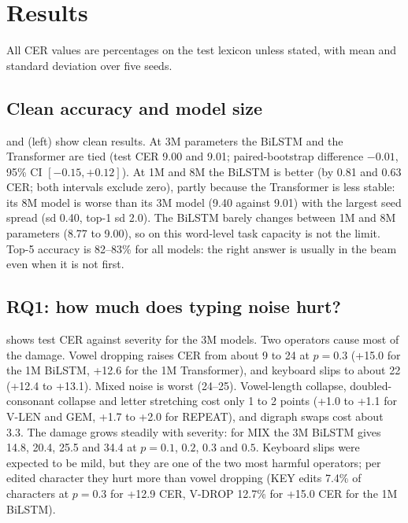 \section{Results}
\label{sec:results}
All CER values are percentages on the test lexicon unless stated, with mean and standard deviation over five seeds.

\subsection{Clean accuracy and model size}
 and  (left) show clean results.
At 3M parameters the BiLSTM and the Transformer are tied (test CER 9.00 and 9.01; paired-bootstrap difference $-0.01$, 95\% CI $[-0.15,+0.12]$).
At 1M and 8M the BiLSTM is better (by 0.81 and 0.63 CER; both intervals exclude zero), partly because the Transformer is less stable: its 8M model is worse than its 3M model (9.40 against 9.01) with the largest seed spread (sd 0.40, top-1 sd 2.0).
The BiLSTM barely changes between 1M and 8M parameters (8.77 to 9.00), so on this word-level task capacity is not the limit.
Top-5 accuracy is 82--83\% for all models: the right answer is usually in the beam even when it is not first.

\begin{table}[t]
\caption{Clean results (mean $\pm$ sd over five seeds). Dev and test CER are in \%, with beam 10. Bold: lowest test CER.}
\label{tab:c3}
\centering\scriptsize
\setlength{\tabcolsep}{3pt}
\resizebox{\columnwidth}{!}{}
\end{table}

\subsection{RQ1: how much does typing noise hurt?}
\label{sec:rq1}
 shows test CER against severity for the 3M models.
Two operators cause most of the damage.
Vowel dropping raises CER from about 9 to 24 at $p{=}0.3$ (+15.0 for the 1M BiLSTM, +12.6 for the 1M Transformer), and keyboard slips to about 22 (+12.4 to +13.1).
Mixed noise is worst (24--25).
Vowel-length collapse, doubled-consonant collapse and letter stretching cost only 1 to 2 points (+1.0 to +1.1 for V-LEN and GEM, +1.7 to +2.0 for REPEAT), and digraph swaps cost about 3.3.
The damage grows steadily with severity: for MIX the 3M BiLSTM gives 14.8, 20.4, 25.5 and 34.4 at $p=0.1$, $0.2$, $0.3$ and $0.5$.
Keyboard slips were expected to be mild, but they are one of the two most harmful operators; per edited character they hurt more than vowel dropping (KEY edits 7.4\% of characters at $p{=}0.3$ for +12.9 CER, V-DROP 12.7\% for +15.0 CER for the 1M BiLSTM).

